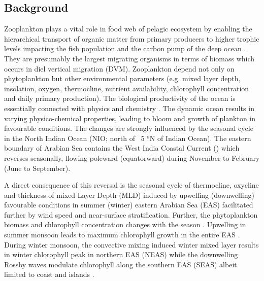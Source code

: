 \documentclass{article}
\begin{document}
	\subsection{Background}
	Zooplankton plays a vital role in food web of pelagic ecosystem by enabling the hierarchical transport of organic matter from primary producers to higher trophic levels impacting the fish population \citep{ohman2001density} and the carbon pump of the deep ocean \citep{le2016global}. They are presumably the largest migrating organisms in terms of biomass \citep{hays2003review} which occurs in diel vertical migration (DVM). Zooplankton depend not only on phytoplankton but other environmental parameters (e.g. mixed layer depth, insolation, oxygen, thermocline, nutrient availability, chlorophyll concentration and daily primary production). The biological productivity of the ocean is essentially connected with physics and chemistry \citep{subrahmanyan1959studiespart2, ryther1966primary, qasim1977biological, nair1970primary,banse1995zooplankton,mccreary2009biophysical, vijith2016consequences,amol2020modulation}. The dynamic ocean results in varying physico-chemical properties, leading to bloom and growth of plankton in favourable conditions. The changes are strongly influenced by the seasonal cycle in the North Indian Ocean (NIO; north of ~5 $^o$N of Indian Ocean). The eastern boundary of Arabian Sea contains the West India Coastal Current (\citep[WICC]{ramamirtham1965hydrography, banse1968hydrography, shetye1990hydrography,mccreary1993numerical, amol2014observed, vijith2016consequences, chaudhuri2020observed}) which reverses seasonally, flowing poleward (equatorward) during November to February (June to September). 
	
	A direct consequence of this reversal is the seasonal cycle of thermocline, oxycline and thickness of mixed Layer Depth (MLD) induced by upwelling (downwelling) favourable conditions in summer (winter) eastern Arabian Sea (EAS) facilitated further by wind speed and near-surface stratification. Further, the phytoplankton biomass and chlorophyll concentration changes with the season \citep{subrahmanyan1960studies, banse1968hydrography, levy2007basin, vijith2016consequences}. Upwelling in  summer monsoon leads to maximum chlorophyll growth in the entire EAS \citep{ banse1968hydrography, banse2000geographical, mccreary2009biophysical, hood2017biogeochemical,shi2022phytoplankton}. During winter monsoon, the convective mixing induced winter mixed layer \citep{shetye1992does, madhupratap1996mechanism,mccreary1996four, levy2007basin,  shankar2016inhibition, vijith2016consequences, keerthi2017physical,shi2022phytoplankton} results in winter chlorophyll peak in northern EAS (NEAS) while the downwelling Rossby waves modulate chlorophyll along the southern EAS (SEAS) albeit limited to coast and islands \citep{amol2020modulation}. 
	
\end{document}
